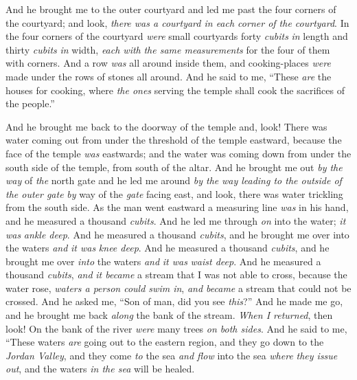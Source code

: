 \begin{biblechapter}
\verse And he brought me to the outer courtyard and led me past the four corners of the courtyard; and look, \textit{there was a courtyard in each corner of the courtyard}.
\verse In the four corners of the courtyard \textit{were} small courtyards forty \textit{cubits} \textit{in} length and thirty \textit{cubits} \textit{in} width, \textit{each with} \textit{the same measurements} for the four of them with corners.
\verse And a row \textit{was} all around inside them, and cooking-places \textit{were} made under the rows of stones all around.
\verse And he said to me, “These \textit{are} the houses for cooking, where \textit{the ones} serving the temple shall cook the sacrifices of the people.”
\end{biblechapter}

\begin{biblechapter} %
 And he brought me back to the doorway of the temple and, look! There was water coming out from under the threshold of the temple eastward, because the face of the temple \textit{was} eastwards; and the water was coming down from under the south side of the temple, from south of the altar.
\verse And he brought me out \textit{by the way} of \textit{the} north gate and he led me around \textit{by the} \textit{way leading to the outside of the outer gate} \textit{by} way of the \textit{gate} facing east, and look, there was water trickling from the south side.
\verse As the man went eastward a measuring line \textit{was} in his hand, and he measured a thousand \textit{cubits}. And he led me through \textit{on} into the water; \textit{it was} \textit{ankle deep}.
\verse And he measured a thousand \textit{cubits}, and he brought me over into the waters \textit{and} \textit{it was} \textit{knee deep}. And he measured a thousand \textit{cubits}, and he brought me over \textit{into} the waters \textit{and} \textit{it was} \textit{waist deep}.
\verse And he measured a thousand \textit{cubits}, \textit{and} \textit{it became} a stream that I was not able to cross, because the water rose, \textit{waters a person could swim in}, \textit{and became} a stream that could not be crossed.
\verse And he asked me, “Son of man, did you see \textit{this}?” And he made me go, and he brought me back \textit{along} the bank of the stream.
\verse \textit{When I returned}, then look! On the bank of the river \textit{were} many trees \textit{on both sides}.
\verse And he said to me, “These waters \textit{are} going out to the eastern region, and they go down to the \textit{Jordan Valley}, and they come \textit{to} the sea \textit{and flow} into the sea \textit{where} \textit{they issue out}, and the waters \textit{in the sea} will be healed.

\end{biblechapter}
